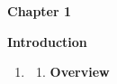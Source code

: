 \documentclass[10pt]{article} %
\begin{document}
\newpage
\begin{Center}

\noindent \textbf{\Large Chapter 1}

\vspace{10mm}

\noindent \textbf{\Large Introduction}
\end{Center}
\noindent 

\noindent 

\noindent 

\begin{enumerate}
\item \begin{enumerate}
\item  \textbf{\large Overview }
\end{enumerate}
\end{enumerate}

\noindent \textbf{}
\end{document}
